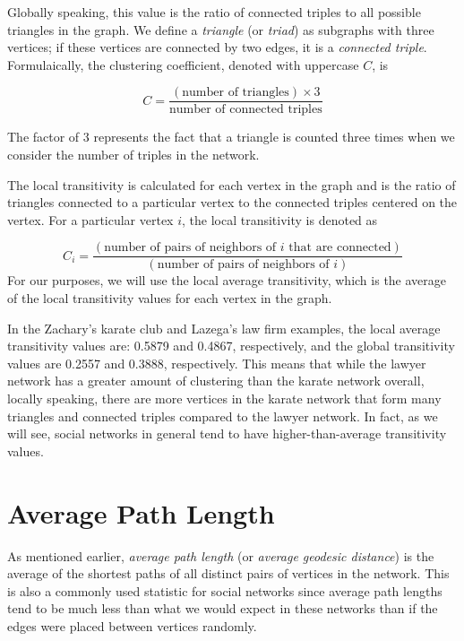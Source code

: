 \documentclass[12pt,twoside]{amherstthesis}
\begin{document}
  Globally speaking, this value is the ratio of connected triples to all
  possible triangles in the graph. We define a \emph{triangle} (or
  \emph{triad}) as subgraphs with three vertices; if these vertices are
  connected by two edges, it is a \emph{connected triple}. Formulaically,
  the clustering coefficient, denoted with uppercase \(C\), is
  
  \[C = \frac {(\text{number of triangles}) \times 3} {\text{number of connected triples}} \]
  
  The factor of \(3\) represents the fact that a triangle is counted three
  times when we consider the number of triples in the network.
  
  The local transitivity is calculated for each vertex in the graph and is
  the ratio of triangles connected to a particular vertex to the connected
  triples centered on the vertex. For a particular vertex \(i\), the local
  transitivity is denoted as
  
  \[ C_{i} = \frac {(\text{number of pairs of neighbors of } i \text{ that are connected})} {(\text{number of pairs of neighbors of } i)} \]
  For our purposes, we will use the local average transitivity, which is
  the average of the local transitivity values for each vertex in the
  graph.
  
  In the Zachary's karate club and Lazega's law firm examples, the local
  average transitivity values are: 0.5879 and 0.4867, respectively, and
  the global transitivity values are 0.2557 and 0.3888, respectively. This
  means that while the lawyer network has a greater amount of clustering
  than the karate network overall, locally speaking, there are more
  vertices in the karate network that form many triangles and connected
  triples compared to the lawyer network. In fact, as we will see, social
  networks in general tend to have higher-than-average transitivity
  values.
  
  \section{Average Path Length}\label{average-path-length}
  
  As mentioned earlier, \emph{average path length} (or \emph{average
  geodesic distance}) is the average of the shortest paths of all distinct
  pairs of vertices in the network. This is also a commonly used statistic
  for social networks since average path lengths tend to be much less than
  what we would expect in these networks than if the edges were placed
  between vertices randomly.
  
\end{document}
